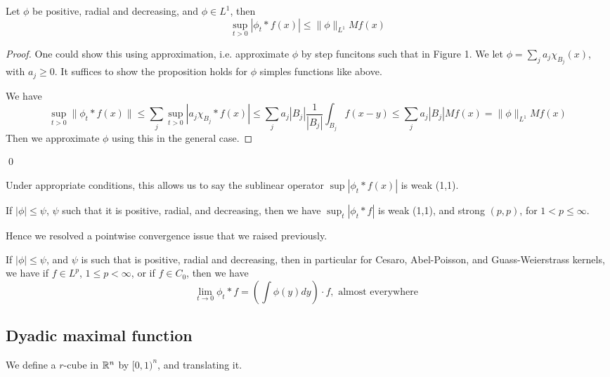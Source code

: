 \begin{proposition}
    Let $\phi$ be positive, radial and decreasing, and $\phi\in L^1$, then 
    \begin{equation*}
        \sup_{t>0}|\phi_t\ast f(x)|\leq\|\phi\|_{L^1}Mf(x)
    \end{equation*}
\end{proposition}
\begin{proof}
    One could show this using approximation, i.e. approximate $\phi$ by step funcitons such that in Figure 1. We let $\phi=\sum_ja_j\chi_{B_j}(x)$, with $a_j\geq 0$. It suffices to show the proposition holds for $\phi$ simples functions like above.

    We have
    \begin{equation*}
        \sup_{t>0}\|\phi_t\ast f(x)\|\leq\sum_j\sup_{t>0}|a_j\chi_{B_j}\ast f(x)|\leq\sum_j a_j|B_j|\frac{1}{|B_j|}\int_{B_j}f(x-y)\leq \sum_ja_j|B_j|Mf(x)=\|\phi\|_{L^1}Mf(x)
    \end{equation*}
    Then we approximate $\phi$ using this in the general case.
\end{proof}
\qed

\begin{note}
    Under appropriate conditions, this allows us to say the sublinear operator $\sup|\phi_t\ast f(x)|$ is weak (1,1).
\end{note}

\begin{corollary}
    If $|\phi|\leq\psi$, $\psi$ such that it is positive, radial, and decreasing, then we have
    $\sup_t|\phi_t\ast f|$ is weak (1,1), and strong $(p,p)$, for $1<p\leq\infty$.
\end{corollary}
Hence we resolved a pointwise convergence issue that we raised previously.
\begin{corollary}
    If $|\phi|\leq\psi$, and $\psi$ is such that is positive, radial and decreasing, then in particular for Cesaro, Abel-Poisson, and Guass-Weierstrass kernels, we have if $f\in L^p$, $1\leq p<\infty$, or if $f\in C_0$, then we have
    \begin{equation*}
        \lim_{t\to 0}\phi_t\ast f=\left(\int\phi(y)dy\right)\cdot f, \text{ almost everywhere }
    \end{equation*}
\end{corollary}


\subsection{Dyadic maximal function}
We define a $r$-cube in $\mathbb{R}^n$ by $[0,1)^n$, and translating it.

